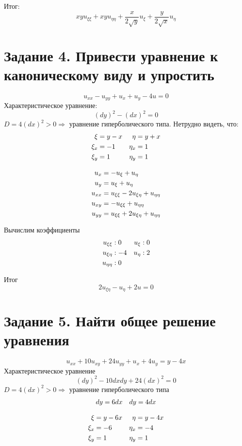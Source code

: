 \documentclass[a4paper,12pt]{article}
\begin{document}
Итог:
$$xyu_{\xi\xi} + xyu_{\eta\eta} + \frac{x}{2\sqrt{y}}u_\xi + \frac{y}{2\sqrt{x}}u_\eta$$

\section{Задание 4. Привести уравнение к каноническому виду и упростить}
$$u_{xx} - u_{yy} + u_x + u_y - 4u = 0$$
Характеристическое уравнение:
$$(dy)^2 - (dx)^2 = 0$$
$D = 4(dx)^2 > 0 \Rightarrow$ уравнение гиперболического типа.
Нетрудно видеть, что: 
\begin{align}
\xi &= y-x &\eta &= y+x \notag \\
\xi_x &= -1 &\eta_x &= 1 \notag \\
\xi_y &= 1 &\eta_y &= 1 \notag 
\end{align}

\begin{align}
u_x &= -u_\xi + u_\eta \notag \\
u_y &= u_\xi + u_\eta \notag \\
u_{xx} &= u_{\xi\xi} - 2u_{\xi\eta} + u_{\eta\eta} \notag \\
u_{xy} &= -u_{\xi\xi} + u_{\eta\eta} \notag \\
u_{yy} &= u_{\xi\xi} + 2u_{\xi\eta} + u_{\eta\eta} \notag
\end{align}

Вычислим коэффициенты
\begin{align}
    u_{\xi\xi} &: 0 &u_\xi &: 0 \notag \\
    u_{\xi\eta} &: -4 &u_\eta &: 2 \notag \\
    u_{\eta\eta} &: 0 \notag
\end{align}

Итог
$$2u_{\xi\eta} - u_\eta + 2u = 0$$

\section{Задание 5. Найти общее решение уравнения}
$$u_{xx} + 10u_{xy} + 24u_{yy} + u_x + 4u_y = y-4x$$
Характеристическое уравнение
$$(dy)^2 - 10dxdy + 24(dx)^2 = 0$$
$D = 4(dx)^2 > 0 \Rightarrow$ уравнение гиперболического типа
\begin{align}
dy &= 6dx &dy = 4dx \notag
\end{align}

\begin{align}
\xi &= y - 6x &\eta &= y-4x \notag \\
\xi_x &= -6 &\eta_x &= -4 \notag \\
\xi_y &= 1 &\eta_y &= 1 \notag
\end{align}
\end{document}
